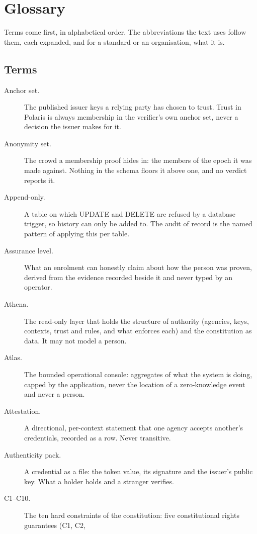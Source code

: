 \section{Glossary}
\label{app:glossary}

Terms come first, in alphabetical order. The abbreviations the text uses follow them, each expanded,
and for a standard or an organisation, what it is.

\subsection*{Terms}

\begin{description}
  \item[Anchor set.] The published issuer keys a relying party has chosen to trust. Trust in Polaris
    is always membership in the verifier's own anchor set, never a decision the issuer makes for it.
  \item[Anonymity set.] The crowd a membership proof hides in: the members of the epoch it was made
    against. Nothing in the schema floors it above one, and no verdict reports it.
  \item[Append-only.] A table on which UPDATE and DELETE are refused by a database trigger, so history
    can only be added to. The audit of record is the named pattern of applying this per table.
  \item[Assurance level.] What an enrolment can honestly claim about how the person was proven, derived
    from the evidence recorded beside it and never typed by an operator.
  \item[Athena.] The read-only layer that holds the structure of authority (agencies, keys, contexts, trust
    and rules, and what enforces each) and the constitution as data. It may not model a person.
  \item[Atlas.] The bounded operational console: aggregates of what the system is doing, capped by the
    application, never the location of a zero-knowledge event and never a person.
  \item[Attestation.] A directional, per-context statement that one agency accepts another's
    credentials, recorded as a row. Never transitive.
  \item[Authenticity pack.] A credential as a file: the token value, its signature and the issuer's
    public key. What a holder holds and a stranger verifies.
  \item[C1--C10.] The ten hard constraints of the constitution: five constitutional rights guarantees (C1, C2,

\end{description}
